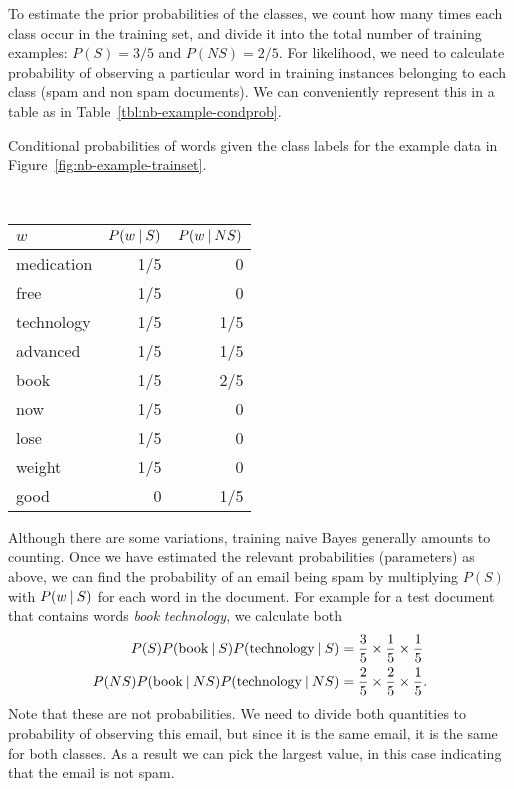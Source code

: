 To estimate the prior probabilities of the classes,
we count how many times each class occur in the training set,
and divide it into the total number of training examples:
$P(S) = 3/5$ and $P(NS) = 2/5$.
For likelihood, we need to calculate probability of observing
a particular word in training instances belonging to each class 
(spam and non spam documents).
We can conveniently represent this in a table
as in Table~\ref{tbl:nb-example-condprob}.
\begin{margintable}
  \caption{\label{tbl:nb-example-condprob}
    Conditional probabilities of words given the class labels
    for the example data in Figure~\ref{fig:nb-example-trainset}.
  }
  \centering
  ~\\[1mm]
  \begin{tabular}{lrr}
    \toprule
    $w$ & $P(w\:\vert\:{}S)$ & $P(w\:\vert\:{}NS)$ \\
    \midrule
    medication  & 1/5 & 0  \\
    free        & 1/5 & 0  \\
    technology  & 1/5 & 1/5\\
    advanced    & 1/5 & 1/5\\
    book        & 1/5 & 2/5\\
    now         & 1/5 & 0  \\
    lose        & 1/5 & 0  \\
    weight      & 1/5 & 0  \\
    good        & 0   & 1/5\\
    \bottomrule
  \end{tabular}
\end{margintable}
Although there are some variations,
training naive Bayes generally amounts to counting.
Once we have estimated the relevant probabilities (parameters)
as above,
we can find the probability of an email being spam
  by multiplying $P(S)$ with $P(w\:\vert\:{}S)$ for each word in the document.
For example for a test document that contains words \emph{book} \emph{technology},
we calculate both
\begin{align*}
  P(S)P(\text{book}\:\vert\:{}S)P(\text{technology}\:\vert\:{}S) &= \frac{3}{5} \times \frac{1}{5} \times \frac{1}{5}\\
  P(NS)P(\text{book}\:\vert\:{}NS)P(\text{technology}\:\vert\:{}NS) &= \frac{2}{5} \times \frac{2}{5} \times \frac{1}{5} .\\
\end{align*}
Note that these are not probabilities.
We need to divide both quantities to probability of observing this email,
but since it is the same email,
it is the same for both classes.
As a result we can pick the largest value,
in this case indicating that the email is not spam.

